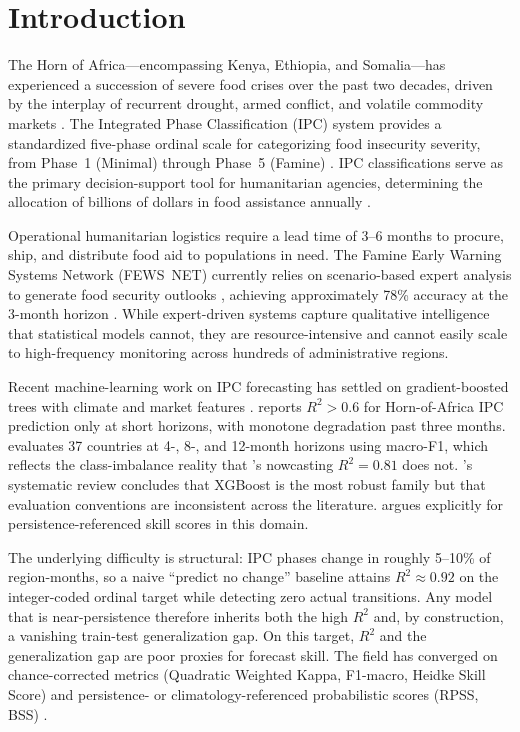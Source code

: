 \documentclass[11pt,letterpaper]{article}
\begin{document}
\section{Introduction}

The Horn of Africa---encompassing Kenya, Ethiopia, and Somalia---has experienced a succession of severe food crises over the past two decades, driven by the interplay of recurrent drought, armed conflict, and volatile commodity markets \citep{ocha2023}. The Integrated Phase Classification (IPC) system provides a standardized five-phase ordinal scale for categorizing food insecurity severity, from Phase~1 (Minimal) through Phase~5 (Famine) \citep{ipc2021}. IPC classifications serve as the primary decision-support tool for humanitarian agencies, determining the allocation of billions of dollars in food assistance annually \citep{wfp2024}.

Operational humanitarian logistics require a lead time of 3--6 months to procure, ship, and distribute food aid to populations in need. The Famine Early Warning Systems Network (FEWS~NET) currently relies on scenario-based expert analysis to generate food security outlooks \citep{fewsnet2023}, achieving approximately 78\% accuracy at the 3-month horizon \citep{bertetti2024}. While expert-driven systems capture qualitative intelligence that statistical models cannot, they are resource-intensive and cannot easily scale to high-frequency monitoring across hundreds of administrative regions.

Recent machine-learning work on IPC forecasting has settled on gradient-boosted trees with climate and market features \citep{busker2024, westerveld2021, machefer2025}. \citet{busker2024} reports $R^2 > 0.6$ for Horn-of-Africa IPC prediction only at short horizons, with monotone degradation past three months. \citet{andree2022} evaluates 37 countries at 4-, 8-, and 12-month horizons using macro-F1, which reflects the class-imbalance reality that \citet{martini2022}'s nowcasting $R^2 = 0.81$ does not. \citet{machefer2025}'s systematic review concludes that XGBoost is the most robust family but that evaluation conventions are inconsistent across the literature. \citet{zhou2023} argues explicitly for persistence-referenced skill scores in this domain.

The underlying difficulty is structural: IPC phases change in roughly 5--10\% of region-months, so a naive ``predict no change'' baseline attains $R^2 \approx 0.92$ on the integer-coded ordinal target while detecting zero actual transitions. Any model that is near-persistence therefore inherits both the high $R^2$ and, by construction, a vanishing train-test generalization gap. On this target, $R^2$ and the generalization gap are poor proxies for forecast skill. The field has converged on chance-corrected metrics (Quadratic Weighted Kappa, F1-macro, Heidke Skill Score) and persistence- or climatology-referenced probabilistic scores (RPSS, BSS) \citep{weigel2007, mason2008}.
\end{document}
